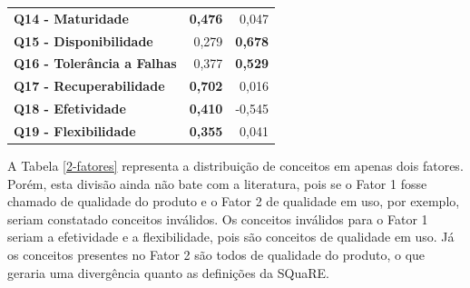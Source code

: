 \begin{apendicesenv}
\begin{longtable}{rrr}
       \multicolumn{1}{l}{\textbf{Q14 - Maturidade}} & \textbf{0,476} & 0,047 \\
       \multicolumn{1}{l}{\textbf{Q15 - Disponibilidade}} & 0,279  & \textbf{0,678} \\
       \multicolumn{1}{l}{\textbf{Q16 - Tolerância a Falhas}} & 0,377  & \textbf{0,529} \\
       \multicolumn{1}{l}{\textbf{Q17 - Recuperabilidade}} & \textbf{0,702} & 0,016 \\
       \multicolumn{1}{l}{\textbf{Q18 - Efetividade}} & \textbf{0,410} & -0,545 \\
       \multicolumn{1}{l}{\textbf{Q19 - Flexibilidade}} & \textbf{0,355} & 0,041 \\
       \hline
       \end{longtable}%
       
A Tabela \ref{2-fatores} representa a distribuição de conceitos em apenas dois fatores. Porém, esta divisão ainda não bate com a literatura, pois se o Fator 1 fosse chamado de qualidade do produto e o Fator 2 de qualidade em uso, por exemplo, seriam constatado conceitos inválidos. Os conceitos inválidos para o Fator 1 seriam a efetividade e a flexibilidade, pois são conceitos de qualidade em uso. Já os conceitos presentes no Fator 2 são todos de qualidade do produto, o que geraria uma divergência quanto as definições da SQuaRE.



\end{apendicesenv}
